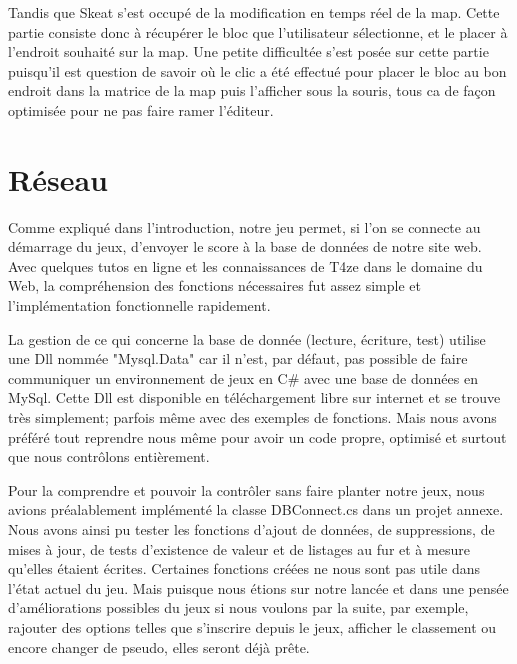 \documentclass [11pt]{report}
\begin{document}
		\vspace{10mm}
		
		
		Tandis que Skeat s'est occupé de la modification en temps réel de la map. Cette partie consiste donc à récupérer le bloc que l'utilisateur sélectionne, et le placer à l'endroit souhaité sur la map. Une petite difficultée s'est posée sur cette partie puisqu'il est question de savoir où le clic a été effectué pour placer le bloc au bon endroit dans la matrice de la map puis l'afficher sous la souris, tous ca de façon optimisée pour ne pas faire ramer l'éditeur.\\
			 
			
	
	
	\newpage
	
	\section{Réseau}
	Comme expliqué dans l'introduction, notre jeu permet, si l'on se connecte au démarrage du jeux, d'envoyer le score à la base de données de notre site web.\\
	
	Avec quelques tutos en ligne et les connaissances de T4ze dans le domaine du Web, la compréhension des fonctions nécessaires fut assez simple et l'implémentation fonctionnelle rapidement.
	
	La gestion de ce qui concerne la base de donnée (lecture, écriture, test) utilise une Dll nommée "Mysql.Data" car il n'est, par défaut, pas possible de faire communiquer un environnement de jeux en C\# avec une base de données en MySql. Cette Dll est disponible en téléchargement libre sur internet et se trouve très simplement; parfois même avec des exemples de fonctions. Mais nous avons préféré tout reprendre nous même pour avoir un code propre, optimisé et surtout que nous contrôlons entièrement.
	
	Pour la comprendre et pouvoir la contrôler sans faire planter notre jeux, nous avions préalablement implémenté la classe DBConnect.cs dans un projet annexe. Nous avons ainsi pu tester les fonctions d'ajout de données, de suppressions, de mises à jour, de tests d'existence de valeur et de listages au fur et à mesure qu'elles étaient écrites. Certaines fonctions créées ne nous sont pas utile dans l'état actuel du jeu. Mais puisque nous étions sur notre lancée et dans une pensée d'améliorations possibles du jeux si nous voulons par la suite, par exemple, rajouter des options telles que s'inscrire depuis le jeux, afficher le classement ou encore changer de pseudo, elles seront déjà prête.\\
	
\end{document}
